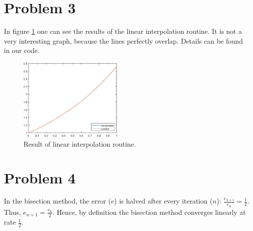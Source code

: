 \documentclass[12pt]{article}
\newcommand{\?}{\stackrel{?}{=}}
\begin{document}
\section*{Problem 3}
In figure \ref{fig:lin_int} one can see the results of the linear interpolation routine. It is not a very interesting graph, because the lines perfectly overlap. Details can be found in our code.

\begin{figure}[htbp!]
    \centering
    \includegraphics[width=0.45\textwidth]{PS1/ps3.eps}
    \caption{Result of linear interpolation routine.}
    \label{fig:lin_int}
\end{figure}


\section*{Problem 4}

In the bisection method, the error ($e$) is halved after every iteration ($n$): $\frac{e_{n+1}}{e_n} = \frac{1}{2}$. Thus, $e_{n+1} = \frac{e_n}{2}$. Hence, by definition the bisection method converges linearly at rate $\frac{1}{2}$.
\end{document}
